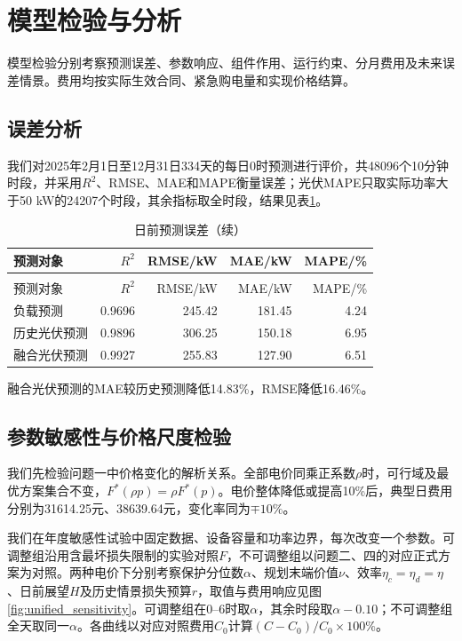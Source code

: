 \section{模型检验与分析}

模型检验分别考察预测误差、参数响应、组件作用、运行约束、分月费用及未来误差情景。费用均按实际生效合同、紧急购电量和实现价格结算。

\subsection{误差分析}

我们对2025年2月1日至12月31日334天的每日0时预测进行评价，共48096个10分钟时段，并采用$R^2$、RMSE、MAE和MAPE衡量误差\cite{hyndman2006another}；光伏MAPE只取实际功率大于50 kW的24207个时段，其余指标取全时段，结果见表\ref{tab:error}。

\Needspace{0.25\textheight}
\begin{longtable}{lrrrr}
\caption{日前预测误差}\label{tab:error}\\
\toprule 预测对象 & $R^2$ & RMSE/kW & MAE/kW & MAPE/\%\\
\midrule\endfirsthead
\caption{日前预测误差（续）}\\
\toprule 预测对象 & $R^2$ & RMSE/kW & MAE/kW & MAPE/\%\\
\midrule\endhead\bottomrule\endfoot
负载预测 & 0.9696 & 245.42 & 181.45 & 4.24\\
历史光伏预测 & 0.9896 & 306.25 & 150.18 & 6.95\\
融合光伏预测 & 0.9927 & 255.83 & 127.90 & 6.51\\
\end{longtable}

融合光伏预测的MAE较历史预测降低14.83\%，RMSE降低16.46\%。

\subsection{参数敏感性与价格尺度检验}

我们先检验问题一中价格变化的解析关系。全部电价同乘正系数$\rho$时，可行域及最优方案集合不变，$F^*(\rho p)=\rho F^*(p)$。电价整体降低或提高10\%后，典型日费用分别为31614.25元、38639.64元，变化率同为$\mp10\%$。

\Needspace{0.20\textheight}
我们在年度敏感性试验中固定数据、设备容量和功率边界，每次改变一个参数。可调整组沿用含最坏损失限制的实验对照$F$，不可调整组以问题二、四的对应正式方案为对照。两种电价下分别考察保护分位数$\alpha$、规划末端价值$\nu$、效率$\eta_c=\eta_d=\eta$、日前展望$H$及历史情景损失预算$r$，取值与费用响应见图\ref{fig:unified_sensitivity}。可调整组在0--6时取$\alpha$，其余时段取$\alpha-0.10$；不可调整组全天取同一$\alpha$。各曲线以对应对照费用$C_0$计算$(C-C_0)/C_0\times100\%$。

